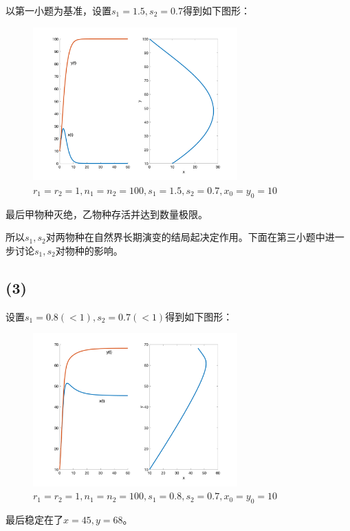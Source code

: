 \documentclass{article}
\begin{document}
以第一小题为基准，设置$s_1=1.5,s_2=0.7$得到如下图形：
\begin{figure}[H]
    \centering
    \includegraphics[width=0.7\textwidth]{pic95.png}
    \caption{$r_1=r_2=1, n_1=n_2=100, s_1=1.5, s_2=0.7, x_0=y_0=10$}
\end{figure}
最后甲物种灭绝，乙物种存活并达到数量极限。

所以$s_1,s_2$对两物种在自然界长期演变的结局起决定作用。下面在第三小题中进一步讨论$s_1,s_2$对物种的影响。

\subsection{(3)}
设置$s_1=0.8(<1),s_2=0.7(<1)$得到如下图形：
\begin{figure}[H]
    \centering
    \includegraphics[width=0.7\textwidth]{pic96.png}
    \caption{$r_1=r_2=1, n_1=n_2=100, s_1=0.8, s_2=0.7, x_0=y_0=10$}
\end{figure}
最后稳定在了$x=45,y=68$。
\end{document}
